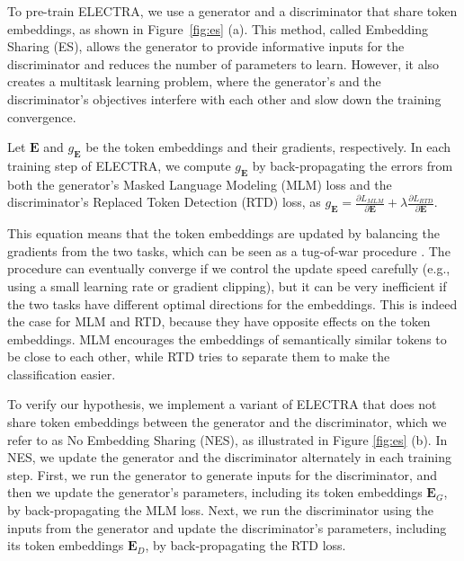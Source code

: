 To pre-train ELECTRA, we use a generator and a discriminator that share token embeddings, as shown in Figure~\ref{fig:es} (a). This method, called Embedding Sharing (ES), allows the generator to provide informative inputs for the discriminator and reduces the number of parameters to learn. However, it also creates a multitask learning problem, where the generator's and the discriminator's objectives interfere with each other and slow down the training convergence. 

Let $\bm{E}$ and $g_{\bm{E}}$ be the token embeddings and their gradients, respectively. In each training step of ELECTRA, we compute $g_{\bm{E}}$ by back-propagating the errors from both the generator's Masked Language Modeling (MLM) loss and the discriminator's Replaced Token Detection (RTD) loss, as $g_{\bm{E}} = \frac{\partial L_{MLM}}{\partial \bm{E}} + \lambda \frac{\partial L_{RTD}}{\partial \bm{E}}$.

This equation means that the token embeddings are updated by balancing the gradients from the two tasks, which can be seen as a tug-of-war procedure \citep{hadsell2020embracing}. The procedure can eventually converge if we control the update speed carefully (e.g., using a small learning rate or gradient clipping), but it can be very inefficient if the two tasks have different optimal directions for the embeddings. This is indeed the case for MLM and RTD, because they have opposite effects on the token embeddings. MLM encourages the embeddings of semantically similar tokens to be close to each other, while RTD tries to separate them to make the classification easier. 

To verify  our hypothesis, we implement a variant of ELECTRA that does not share token embeddings between the generator and the discriminator, which we refer to as No Embedding Sharing (NES), as illustrated in Figure \ref{fig:es} (b). In NES, we update the generator and the discriminator alternately in each training step. First, we run the generator to generate inputs for the discriminator, and then we update the generator's parameters, including its token embeddings $\bm{E} _ G$, by back-propagating the MLM loss. Next, we run the discriminator using the inputs from the generator and update the discriminator's parameters, including its token embeddings $\bm{E} _ D$, by back-propagating the RTD loss.


